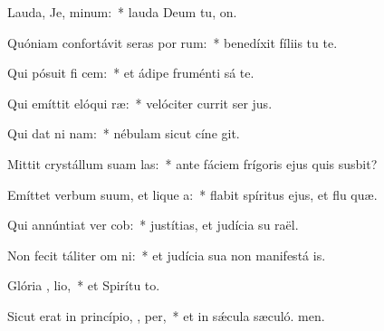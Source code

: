 \item Lauda, Je, minum:~* lauda Deum tu, on.
\item Quóniam confortávit seras por rum:~* benedíxit fíliis tu  te.
\item Qui pósuit fi  cem:~* et ádipe fruménti sá te.
\item Qui emíttit elóqui  ræ:~* velóciter currit ser jus.
\item Qui dat ni  nam:~* nébulam sicut cíne git.
\item Mittit crystállum suam  las:~* ante fáciem frígoris ejus quis susbit?
\item Emíttet verbum suum, et lique a:~* flabit spíritus ejus, et flu quæ.
\item Qui annúntiat ver  cob:~* justítias, et judícia su raël.
\item Non fecit táliter om ni:~* et judícia sua non manifestá is.
\item Glória ,  lio,~* et Spirítu to.
\item Sicut erat in princípio,  ,  per,~* et in sǽcula sæculó. men.
